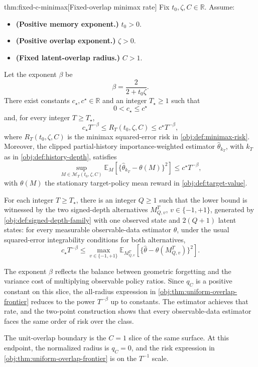 \documentclass[11pt]{article}
\begin{document}
\begin{theoremv}{thm:fixed-c-minimax}[Fixed-overlap minimax rate]
Fix \(t_0,\zeta,C\in\mathbb R\). Assume:
\begin{itemize}
\item \textbf{(Positive memory exponent.)} \(t_0>0\).
\item \textbf{(Positive overlap exponent.)} \(\zeta>0\).
\item \textbf{(Fixed latent-overlap radius.)} \(C>1\).
\end{itemize}
Let the exponent \(\beta\) be
\[
\beta=\frac{2}{2+t_0\zeta}.
\]
There exist constants \(c_\star,c^\star\in\mathbb R\) and an integer \(T_\star\ge 1\) such that
\[
0<c_\star\le c^\star
\]
and, for every integer \(T\ge T_\star\),
\[
c_\star T^{-\beta}
\le
R_T(t_0,\zeta,C)
\le
c^\star T^{-\beta},
\]
where \(R_T(t_0,\zeta,C)\) is the minimax squared-error risk in \cref{obj:def:minimax-risk}. Moreover, the clipped partial-history importance-weighted estimator \(\widehat\theta_{k_T}\), with \(k_T\) as in \cref{obj:def:history-depth}, satisfies
\[
\sup_{M\in\mathcal M_T(t_0,\zeta,C)}
\mathbb E_M\!\left[
\{\widehat\theta_{k_T}-\theta(M)\}^2
\right]
\le
c^\star T^{-\beta},
\]
with \(\theta(M)\) the stationary target-policy mean reward in \cref{obj:def:target-value}.

For each integer \(T\ge T_\star\), there is an integer \(Q\ge 1\) such that the lower bound is witnessed by the two signed-depth alternatives \(M_{Q,v}^T\), \(v\in\{-1,+1\}\), generated by \cref{obj:def:signed-depth-family} with one observed state and \(2(Q+1)\) latent states: for every measurable observable-data estimator \(\widehat\theta\), under the usual squared-error integrability conditions for both alternatives,
\[
c_\star T^{-\beta}
\le
\max_{v\in\{-1,+1\}}
\mathbb E_{M_{Q,v}^T}\!\left[
\{\widehat\theta-\theta(M_{Q,v}^T)\}^2
\right].
\]
\end{theoremv}

The exponent \(\beta\) reflects the balance between geometric forgetting and the variance cost of multiplying observable policy ratios. Since \(q_C\) is a positive constant on this slice, the all-radius expression in \cref{obj:thm:uniform-overlap-frontier} reduces to the power \(T^{-\beta}\) up to constants. The estimator achieves that rate, and the two-point construction shows that every observable-data estimator faces the same order of risk over the class.

The unit-overlap boundary is the \(C=1\) slice of the same surface. At this endpoint, the normalized radius is \(q_C=0\), and the risk expression in \cref{obj:thm:uniform-overlap-frontier} is on the \(T^{-1}\) scale.
\end{document}
